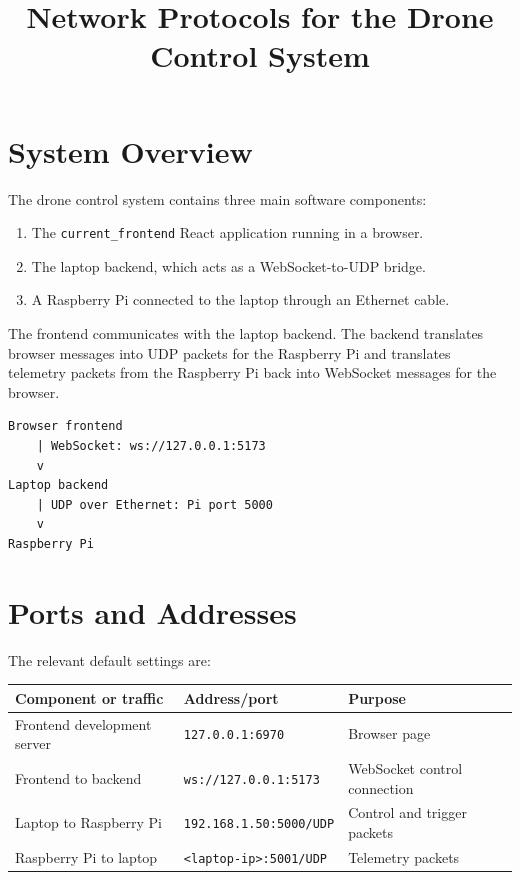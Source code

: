 \documentclass[11pt]{article}
\title{Network Protocols for the Drone Control System}
\author{}
\date{}
\begin{document}
\maketitle

\section{System Overview}

The drone control system contains three main software components:

\begin{enumerate}[leftmargin=*]
    \item The \texttt{current\_frontend} React application running in a browser.
    \item The laptop backend, which acts as a WebSocket-to-UDP bridge.
    \item A Raspberry Pi connected to the laptop through an Ethernet cable.
\end{enumerate}

The frontend communicates with the laptop backend. The backend translates
browser messages into UDP packets for the Raspberry Pi and translates
telemetry packets from the Raspberry Pi back into WebSocket messages for the
browser.

\begin{lstlisting}
Browser frontend
    | WebSocket: ws://127.0.0.1:5173
    v
Laptop backend
    | UDP over Ethernet: Pi port 5000
    v
Raspberry Pi
\end{lstlisting}

\section{Ports and Addresses}

The relevant default settings are:

\begin{center}
\begin{tabular}{>{\ttfamily}l l l}
\toprule
\textnormal{Component or traffic} & \textnormal{Address/port} & \textnormal{Purpose} \\
\midrule
Frontend development server & \texttt{127.0.0.1:6970} & Browser page \\
Frontend to backend & \texttt{ws://127.0.0.1:5173} & WebSocket control connection \\
Laptop to Raspberry Pi & \texttt{192.168.1.50:5000/UDP} & Control and trigger packets \\
Raspberry Pi to laptop & \texttt{<laptop-ip>:5001/UDP} & Telemetry packets \\
\bottomrule
\end{tabular}
\end{center}
\end{document}
